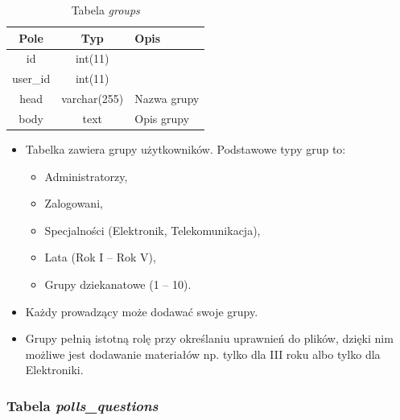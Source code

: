 \documentclass[a4paper,12pt,oneside]{report}
\begin{document}
\begin{table}[h]
  \centering
  \begin{tabular}{|c|c|l|}\hline
  Pole & Typ & Opis \\\hline
  id       & int(11)      & \\
  user\_id & int(11)      & \\
  head     & varchar(255) & Nazwa grupy \\
  body     & text         & Opis grupy \\\hline
  \end{tabular}
  \caption{Tabela \emph{groups}\label{tab:groups}}
\end{table}
\begin{itemize}
  \item Tabelka zawiera grupy użytkowników. Podstawowe typy grup to:
  \begin{itemize}
    \item Administratorzy,
    \item Zalogowani,
    \item Specjalności (Elektronik, Telekomunikacja),
    \item Lata (Rok I -- Rok V),
    \item Grupy dziekanatowe (1 -- 10).
  \end{itemize}
  \item Każdy prowadzący może dodawać swoje grupy.
  \item Grupy pełnią istotną rolę przy określaniu uprawnień do plików, dzięki nim możliwe jest dodawanie materiałów np. tylko dla III roku albo tylko dla Elektroniki.
\end{itemize}

\newpage
\subsubsection{Tabela \emph{polls\_questions}}
\label{subsub:polls_questions}
\end{document}
